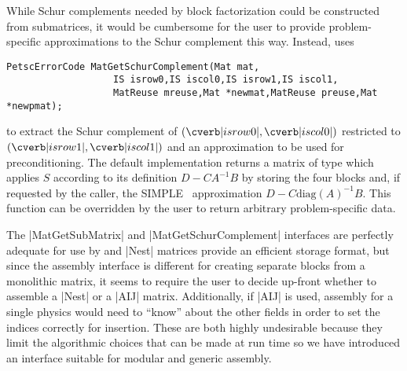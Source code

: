 While Schur complements needed by block factorization could be constructed from submatrices, it would be cumbersome for the user to provide problem-specific approximations to the Schur complement this way.
Instead,  uses
\begin{verbatim}
PetscErrorCode MatGetSchurComplement(Mat mat,
                   IS isrow0,IS iscol0,IS isrow1,IS iscol1,
                   MatReuse mreuse,Mat *newmat,MatReuse preuse,Mat *newpmat);
\end{verbatim}
to extract the Schur complement of $(\cverb|isrow0|,\cverb|iscol0|)$ restricted to $(\cverb|isrow1|,\cverb|iscol1|)$ and an approximation to be used for preconditioning.
The default implementation returns a matrix of type  which applies $S$ according to its definition $D - CA^{-1}B$ by storing the four blocks and, if requested by the caller, the SIMPLE~\cite{patankar1972cph} approximation $D - C\text{diag}(A)^{-1}B$.
This function can be overridden by the user to return arbitrary problem-specific data.

The \cfunc|MatGetSubMatrix| and \cfunc|MatGetSchurComplement| interfaces are perfectly adequate for use by  and \cverb|Nest| matrices provide an efficient storage format, but since the assembly interface is different for creating separate blocks from a monolithic matrix, it seems to require the user to decide up-front whether to assemble a \cverb|Nest| or a \cverb|AIJ| matrix.
Additionally, if \cverb|AIJ| is used, assembly for a single physics would need to ``know'' about the other fields in order to set the indices correctly for insertion.
These are both highly undesirable because they limit the algorithmic choices that can be made at run time so we have introduced an interface suitable for modular and generic assembly.

